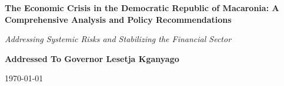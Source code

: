 \begin{titlepage}
    \centering %

    \vspace*{2cm} %
    {\Huge\bfseries The Economic Crisis in the Democratic Republic of Macaronia: A Comprehensive Analysis and Policy Recommendations\par}
    \vspace{1.5cm} %

    {\Large\itshape Addressing Systemic Risks and Stabilizing the Financial Sector\par}
    \vspace{2cm} %

    {\Large\bfseries Addressed To Governor Lesetja Kganyago }
    \vspace{1cm} %
 
    \vspace{2cm} %

    {\Large \today\par} %
    \vfill %


    \vspace{3cm} %
\end{titlepage}
